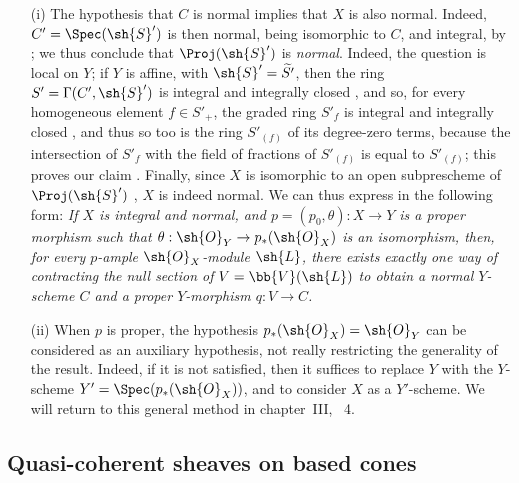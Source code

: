 \begin{remark}[8.11.8]
\label{II.8.11.8}
\begin{itemize}
    \item[\rm{(i)}] The hypothesis that $C$ is normal implies that $X$ is also normal.
        Indeed, $C'=\Spec(\sh{S}')$ is then normal, being isomorphic to $C$, and integral, by ;
        we thus conclude that $\Proj(\sh{S}')$ is \emph{normal}.
        Indeed, the question is local on $Y$;
        if $Y$ is affine, with $\sh{S}'=\widetilde{S'}$, then the ring $S'=\Gamma(C',\sh{S}')$ is integral and integrally closed , and so, for every homogeneous element $f\in S'_+$, the graded ring $S'_f$ is integral and integrally closed \cite[t.~I, p.~257 and 261]{I-13}, and thus so too is the ring $S'_{(f)}$ of its degree-zero terms, because the intersection of $S'_f$ with the field of fractions of $S'_{(f)}$ is equal to $S'_{(f)}$;
        this proves our claim .
        Finally, since $X$ is isomorphic to an open subprescheme of $\Proj(\sh{S}')$ , $X$ is indeed normal.
        We can thus express  in the following form:
        \emph{If $X$ is integral and normal, and $p=(p_0,\theta):X\to Y$ is a proper morphism such that $\theta:\sh{O}_Y\to p_*(\sh{O}_X)$ is an isomorphism, then, for every $p$-ample $\sh{O}_X$-module $\sh{L}$, there exists exactly one way of contracting the null section of $V=\bb{V}(\sh{L})$ to obtain a normal $Y$-scheme $C$ and a proper $Y$-morphism $q:V\to C$.}
    \item[\rm{(ii)}] When $p$ is proper, the hypothesis $p_*(\sh{O}_X)=\sh{O}_Y$ can be considered as an auxiliary hypothesis, not really restricting the generality of the result.
        Indeed, if it is not satisfied, then it suffices to replace $Y$ with the $Y$-scheme $Y'=\Spec(p_*(\sh{O}_X))$, and to consider $X$ as a $Y'$-scheme.
        We will return to this general method in chapter~III, \textsection~4.
\end{itemize}
\end{remark}


\subsection{Quasi-coherent sheaves on based cones}
\label{subsection:II.8.12}

